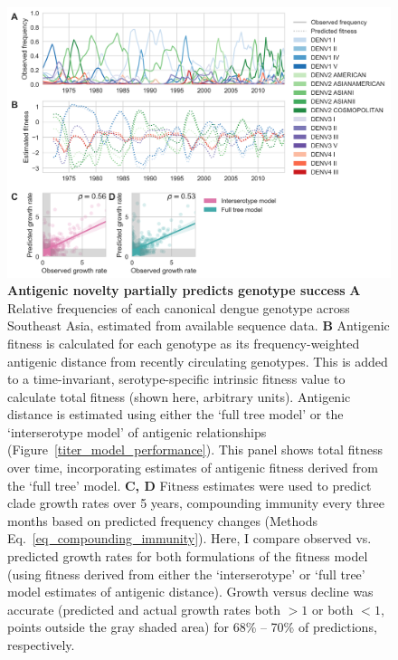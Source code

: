 \begin{figure}[ht!]
  \begin{centering}
\includegraphics[width=.9\linewidth]{./png/genotype-fitness.png}
    \caption[Antigenic novelty partially predicts genotype success]{\textbf{Antigenic novelty partially predicts genotype success }
    \textbf{A} Relative frequencies of each canonical dengue genotype across Southeast Asia, estimated from available sequence data.
    \textbf{B} Antigenic fitness is calculated for each genotype as its frequency-weighted antigenic distance from recently circulating genotypes.
    This is added to a time-invariant, serotype-specific intrinsic fitness value to calculate total fitness (shown here, arbitrary units).
    Antigenic distance is estimated using either the `full tree model' or the `interserotype model' of antigenic relationships (Figure~\ref{titer_model_performance}).
    This panel shows total fitness over time, incorporating estimates of antigenic fitness derived from the `full tree' model.
    \textbf{C, D}  Fitness estimates were used to predict clade growth rates over 5 years, compounding immunity every three months based on predicted frequency changes (Methods Eq.~\ref{eq_compounding_immunity}).
    Here, I compare observed vs. predicted growth rates for both formulations of the fitness model (using fitness derived from either the `interserotype' or `full tree' model estimates of antigenic distance).
    Growth versus decline was accurate (predicted and actual growth rates both $> 1$ or both $< 1$, points outside the gray shaded area) for 68\% -- 70\% of predictions, respectively.
}
     \label{genotype_fitness}
   \end{centering}
\end{figure}

